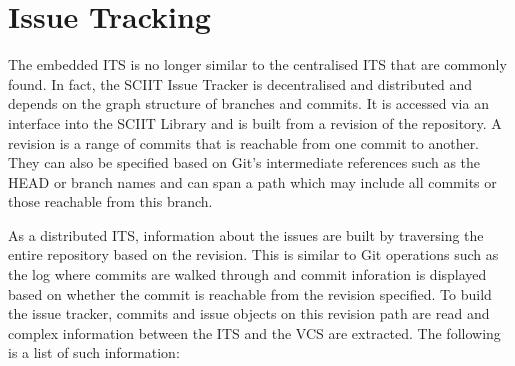 \documentclass{mproj}
\begin{document}
\section{Issue Tracking}

The embedded ITS is no longer similar to the centralised ITS that are commonly found. In fact, the SCIIT Issue Tracker is decentralised and distributed and depends on the graph structure of branches and commits. It is accessed via an interface into the SCIIT Library and is built from a revision of the repository. A revision is a range of commits that is reachable from one commit to another. They can also be specified based on Git's intermediate references such as the HEAD or branch names and can span a path which may include all commits or those reachable from this branch.

As a distributed ITS, information about the issues are built by traversing the entire repository based on the revision. This is similar to Git operations such as the log where commits are walked through and commit inforation is displayed based on whether the commit is reachable from the revision specified. To build the issue tracker, commits and issue objects on this revision path are read and complex information between the ITS and the VCS are extracted. The following is a list of such information:
\end{document}

